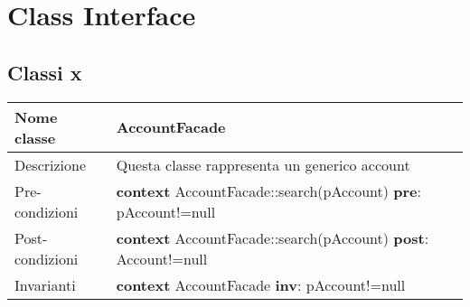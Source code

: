\chapter{Class Interface}
\section{Classi x}
\begin{center}
\begin{longtable}{|a|p{.65\textwidth}|}
\hline 
Nome classe & 
AccountFacade
\tabularnewline
\hline 
Descrizione & 
Questa classe rappresenta un generico account
\tabularnewline
\hline 
Pre-condizioni & 
\textbf{context} AccountFacade::search(pAccount) \textbf{pre}: pAccount!=null
\tabularnewline
\hline 
Post-condizioni & 
\textbf{context} AccountFacade::search(pAccount) \textbf{post}: Account!=null
\tabularnewline
\hline 
Invarianti & 
\textbf{context} AccountFacade \textbf{inv}: pAccount!=null
\tabularnewline
\hline
\end{longtable}
\end{center}
